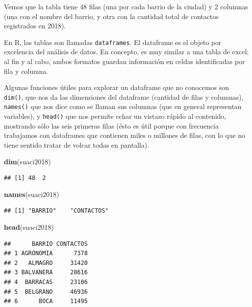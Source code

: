 \documentclass[]{book}
\newenvironment{Shaded}{\begin{snugshade}}{\end{snugshade}}
\newcommand{\KeywordTok}[1]{\textcolor[rgb]{0.13,0.29,0.53}{\textbf{#1}}}
\newcommand{\NormalTok}[1]{#1}
\begin{document}
Vemos que la tabla tiene 48 filas (una por cada barrio de la ciudad) y 2
columnas (una con el nombre del barrio, y otra con la cantidad total de
contactos registrados en 2018).

En R, las tablas son llamadas \texttt{dataframes}. El dataframe es el
objeto por excelencia del análisis de datos. En concepto, es muy similar
a una tabla de excel; al fin y al cabo, ambos formatos guardan
información en celdas identificadas por fila y columna.

Algunas funciones útiles para explorar un dataframe que no conocemos son
\texttt{dim()}, que nos da las dimensiones del dataframe (cantidad de
filas y columnas), \texttt{names()} que nos dice como se llaman sus
columnas (que en general representan variables), y \texttt{head()} que
nos permite echar un vistazo rápido al contenido, mostrando sólo las
seis primeras filas (ésto es útil porque con frecuencia trabajamos con
dataframes que contienen miles o millones de filas, con lo que no tiene
sentido tratar de volcar todas en pantalla).

\begin{Shaded}
\begin{Highlighting}[]
\KeywordTok{dim}\NormalTok{(suaci2018)}
\end{Highlighting}
\end{Shaded}

\begin{verbatim}
## [1] 48  2
\end{verbatim}

\begin{Shaded}
\begin{Highlighting}[]
\KeywordTok{names}\NormalTok{(suaci2018)}
\end{Highlighting}
\end{Shaded}

\begin{verbatim}
## [1] "BARRIO"    "CONTACTOS"
\end{verbatim}

\begin{Shaded}
\begin{Highlighting}[]
\KeywordTok{head}\NormalTok{(suaci2018)}
\end{Highlighting}
\end{Shaded}

\begin{verbatim}
##      BARRIO CONTACTOS
## 1 AGRONOMIA      7378
## 2   ALMAGRO     31420
## 3 BALVANERA     28616
## 4  BARRACAS     23106
## 5  BELGRANO     46936
## 6      BOCA     11495
\end{verbatim}
\end{document}
